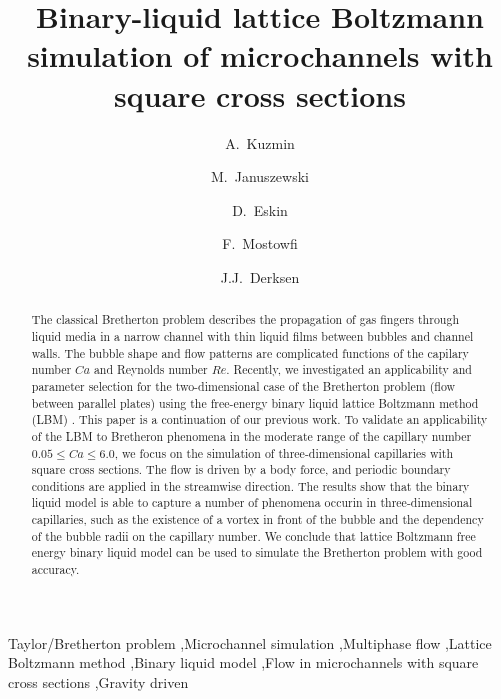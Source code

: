 \documentclass[preprint,12pt]{elsarticle}
\begin{document}
\begin{frontmatter}
\title{Binary-liquid lattice Boltzmann simulation of microchannels with square cross sections}
\author[uofa]{A.~Kuzmin}
\author[us]{M.~Januszewski}
\author[schlum]{D.~Eskin}
\author[schlum]{F.~Mostowfi}
\author[uofa]{J.J.~Derksen}
\address[uofa]{Chemical and Materials Engineering, University of Alberta\\ 7th Floor, ECERF, 9107
116 St, Edmonton, Alberta, T6G
2V4 Canada}
\address[us]{Insitute of Physics, University of Silesia, 40-007 Katowice, Poland}
\address[schlum]{Schlumberger DBR Technology Center\\ 9450 17 Ave NW, Edmonton, Alberta, T6N 1M9
Canada}
\begin{abstract}
The classical Bretherton problem describes the propagation of gas fingers through liquid media in a
narrow channel with
thin liquid films between bubbles and channel walls. The bubble shape and flow patterns are
complicated functions of the capilary number $Ca$ and Reynolds number $Re$. Recently, we
investigated
an applicability and parameter selection for the two-dimensional case of the Bretherton problem
(flow
between parallel plates) using the free-energy binary liquid lattice Boltzmann method (LBM)
\cite{kuzmin-binary2d}. This paper is a continuation of our previous work.  To validate an
applicability
of the LBM to Bretheron phenomena in the moderate range of the capillary number $0.05\leq Ca \leq
6.0$,
we focus on the simulation of three-dimensional capillaries with square cross sections.
The flow is driven by a body force, and
periodic boundary conditions are applied in the streamwise direction. The results show that the
binary liquid model is able to capture a number of phenomena occurin in three-dimensional
capillaries, such as the existence of a vortex in front of the bubble and the dependency
of the bubble radii on the capillary number.  We conclude that lattice Boltzmann free energy binary
liquid model can be used to simulate the Bretherton problem with good accuracy. 
\end{abstract}

\begin{keyword}
Taylor/Bretherton problem \sep Microchannel simulation \sep Multiphase flow \sep Lattice Boltzmann
method
\sep Binary liquid model \sep Flow in microchannels with square cross sections \sep Gravity driven

\end{keyword}

\end{frontmatter}
\linenumbers
\end{document}
